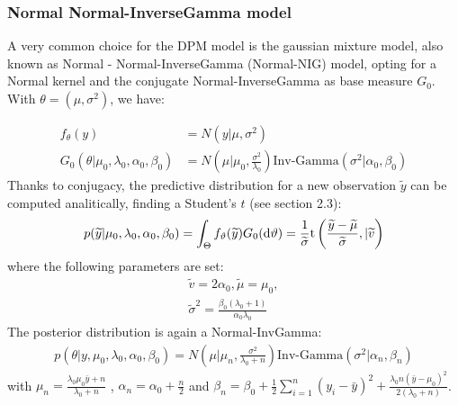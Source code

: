 \subsubsection{Normal Normal-InverseGamma model} \label{nnig}
A very common choice for the DPM model is the gaussian mixture model, also known as Normal - Normal-InverseGamma (Normal-NIG) model, opting for a Normal kernel and the conjugate Normal-InverseGamma as base measure $G_0$. With $\theta=(\mu,\sigma^2)$, we have:

\begin{align}
            	f_\theta(y)&=N(y| \mu ,\sigma^2)  \\
            	G_0(\theta|\mu_0,\lambda_0, \alpha_0, \beta_0)&=N\left(\mu | \mu_0 ,\frac{\sigma^2} {\lambda_0}\right)\text{Inv-Gamma}(\sigma^2|\alpha_0, \beta_0 )
\end{align}
Thanks to conjugacy, the predictive distribution for a new observation $\widetilde{y}$ can be computed analitically, finding a Student's $t$ (see \cite{integral} section 2.3):
\begin{align}
      p(\widetilde{y}|\mu_0,\lambda_0, \alpha_0, \beta_0)= \int_\Theta f_\vartheta(\widetilde{y})G_0(\mathrm d\vartheta)= \frac{1}{\widetilde{\sigma}} \text{t}\left(\frac{\widetilde{y}-\widetilde{\mu}}{\widetilde{\sigma}} ,|\widetilde{v}\right)        	
\end{align}
where the following parameters are set:
\begin{align*}
	\widetilde{v}=2 \alpha_0, \widetilde{\mu}=\mu_0, \\
	\widetilde{\sigma}^2= \frac{\beta_0(\lambda_0+1)}{\alpha_0 \lambda_0}
\end{align*}
The posterior distribution is again a Normal-InvGamma:
\begin{align}
          p(\theta|y,\mu_0,\lambda_0, \alpha_0, \beta_0)=N\left(\mu | \mu_n ,\frac{\sigma^2} {\lambda_0 + n}\right)\text{Inv-Gamma}(\sigma^2|\alpha_n, \beta_n )
\end{align}
with $\mu_n=\frac{\lambda_0 \mu_0 \bar{y} + n}{\lambda_0 + n}$ , $\alpha_n= \alpha_0 + \frac{n}{2} $ and $\beta_n= \beta_0 + \frac{1}{2}\sum_{i=1}^{n} (y_i-\bar{y})^2 + \frac{\lambda_0 n(\bar{y}-\mu_0)^2}{2(\lambda_0 + n)}$.

